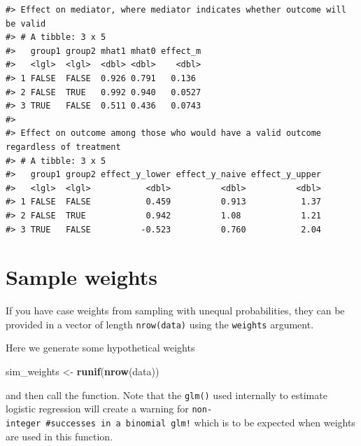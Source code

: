 \documentclass[
]{book}
\newenvironment{Shaded}{\begin{snugshade}}{\end{snugshade}}
\newcommand{\AttributeTok}[1]{\textcolor[rgb]{0.13,0.29,0.53}{#1}}
\newcommand{\CommentTok}[1]{\textcolor[rgb]{0.56,0.35,0.01}{\textit{#1}}}
\newcommand{\FunctionTok}[1]{\textcolor[rgb]{0.13,0.29,0.53}{\textbf{#1}}}
\newcommand{\NormalTok}[1]{#1}
\newcommand{\OtherTok}[1]{\textcolor[rgb]{0.56,0.35,0.01}{#1}}
\newcommand{\SpecialCharTok}[1]{\textcolor[rgb]{0.81,0.36,0.00}{\textbf{#1}}}
\newcommand{\StringTok}[1]{\textcolor[rgb]{0.31,0.60,0.02}{#1}}
\begin{document}
\begin{verbatim}
#> Effect on mediator, where mediator indicates whether outcome will be valid
#> # A tibble: 3 x 5
#>   group1 group2 mhat1 mhat0 effect_m
#>   <lgl>  <lgl>  <dbl> <dbl>    <dbl>
#> 1 FALSE  FALSE  0.926 0.791   0.136 
#> 2 FALSE  TRUE   0.992 0.940   0.0527
#> 3 TRUE   FALSE  0.511 0.436   0.0743
#> 
#> Effect on outcome among those who would have a valid outcome regardless of treatment
#> # A tibble: 3 x 5
#>   group1 group2 effect_y_lower effect_y_naive effect_y_upper
#>   <lgl>  <lgl>           <dbl>          <dbl>          <dbl>
#> 1 FALSE  FALSE           0.459          0.913           1.37
#> 2 FALSE  TRUE            0.942          1.08            1.21
#> 3 TRUE   FALSE          -0.523          0.760           2.04
\end{verbatim}

\hypertarget{sample-weights}{%
\section{Sample weights}\label{sample-weights}}

If you have case weights from sampling with unequal probabilities, they can be provided in a vector of length \texttt{nrow(data)} using the \texttt{weights} argument.

Here we generate some hypothetical weights

\begin{Shaded}
\begin{Highlighting}[]
\NormalTok{sim\_weights }\OtherTok{\textless{}{-}} \FunctionTok{runif}\NormalTok{(}\FunctionTok{nrow}\NormalTok{(data))}
\end{Highlighting}
\end{Shaded}

and then call the function. Note that the \texttt{glm()} used internally to estimate logistic regression will create a warning for \texttt{non-integer\ \#successes\ in\ a\ binomial\ glm!} which is to be expected when weights are used in this function.

\begin{Shaded}
\end{Shaded}
\end{document}
